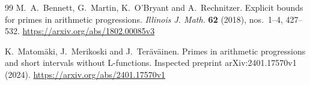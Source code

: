 \documentclass[11pt,reqno]{amsart}
\theoremstyle{blueplain}
\numberwithin{equation}{section}
\def\hyperlink#1#2{#2}}
\begin{document}
\begin{thebibliography}{99}
	\hypertarget{abbr-source:BennettMartinOBryantRechnitzer2018}{}
	M.~A.~Bennett, G.~Martin, K.~O'Bryant and A.~Rechnitzer.
	Explicit bounds for primes in arithmetic progressions.
	\hyperlink{abbr:journal-Illinois-J-Math}{\emph{Illinois J. Math.}} \textbf{62} (2018),
	nos.~1--4, 427--532.
	\url{https://arxiv.org/abs/1802.00085v3}
	
	K.~Matom\"aki, J.~Merikoski and J.~Ter\"av\"ainen.
	Primes in arithmetic progressions and short intervals without L-functions.
	Inspected preprint arXiv:2401.17570v1 (2024).
	\url{https://arxiv.org/abs/2401.17570v1}
	
\end{thebibliography}
\end{document}

